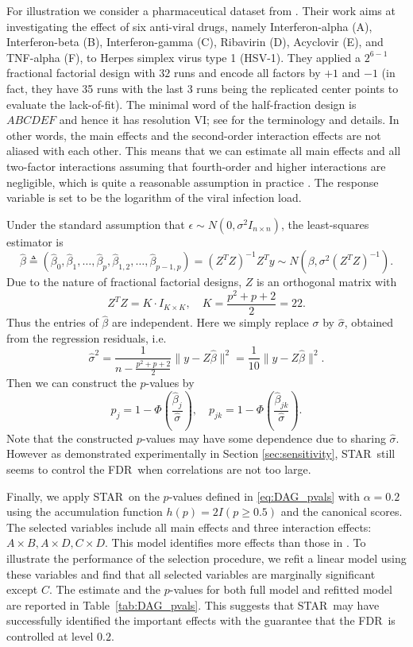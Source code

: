 \documentclass{biometrika}
\newcommand{\textFDR}{FDR}
\renewcommand{\star}{STAR}
\newcommand{\eps}{\epsilon}
\newcommand{\lb}{\left(}
\newcommand{\rb}{\right)}
\newcommand{\1}{\mathbf{1}}
\begin{document}
For illustration we consider a pharmaceutical dataset from \cite{jaynes13}. Their work aims at investigating the effect of six anti-viral drugs, namely Interferon-alpha (A), Interferon-beta (B), Interferon-gamma (C), Ribavirin (D), Acyclovir (E), and TNF-alpha (F), to Herpes simplex virus type 1 (HSV-1). They applied a $2^{6-1}$ fractional factorial design with $32$ runs and encode all factors by $+1$ and $-1$ (in fact, they have 35 runs with the last 3 runs being the replicated center points to evaluate the lack-of-fit).  The minimal word of the half-fraction design is $ABCDEF$ and hence it has resolution VI; see \cite{wu00} for the terminology and details. In other words, the main effects and the second-order interaction effects are not aliased with each other. This means that we can estimate all main effects and all two-factor interactions assuming that fourth-order and higher interactions are negligible, which is quite a reasonable assumption in practice \citep{jaynes13}. The response variable is set to be the logarithm of the viral infection load. 

Under the standard assumption that $\eps\sim N(0, \sigma^{2}I_{n\times n})$, the least-squares estimator is
\[\hat{\beta}\triangleq (\hat{\beta}_{0}, \hat{\beta}_{1}, \ldots, \hat{\beta}_{p}, \hat{\beta}_{1,2}, \ldots, \hat{\beta}_{p-1,p}) = (Z^{T}Z)^{-1}Z^{T}y\sim N(\beta, \sigma^{2}(Z^{T}Z)^{-1}).\]
Due to the nature of fractional factorial designs, $Z$ is an orthogonal matrix with 
\[Z^{T}Z = K\cdot I_{K\times K}, \quad K = \frac{p^2 + p + 2}{2} = 22.\]
Thus the entries of $\hat{\beta}$ are independent. Here we simply replace $\sigma$ by $\hat{\sigma}$, obtained from the regression residuals, i.e.
\[\hat{\sigma}^{2} = \frac{1}{n - \frac{p^{2} + p + 2}{2}}\|y- Z\hat{\beta}\|^{2} = \frac{1}{10}\|y- Z\hat{\beta}\|^{2}.\]
Then we can construct the $p$-values by
\begin{equation}\label{eq:DAG_pvals}
p_{j} = 1 - \Phi\lb\frac{\hat{\beta}_{j}}{\hat{\sigma}}\rb, \quad p_{jk} = 1 - \Phi\lb\frac{\hat{\beta}_{jk}}{\hat{\sigma}}\rb.
\end{equation}
Note that the constructed $p$-values may have some dependence due to sharing $\hat\sigma$. However as demonstrated experimentally in Section \ref{sec:sensitivity}, \star ~still seems to control the \textFDR ~when correlations are not too large. 

Finally, we apply \star ~on the $p$-values defined in \eqref{eq:DAG_pvals} with $\alpha = 0.2$ using the accumulation function $h(p) = 2I(p\ge 0.5)$ and the canonical scores. The selected variables include all main effects and three interaction effects: $A\times B, A\times D, C\times D$. This model identifies more effects than those in \cite{jaynes13}. To illustrate the performance of the selection procedure, we refit a linear model using these variables and find that all selected variables are marginally significant except $C$. The estimate and the $p$-values for both full model and refitted model are reported in Table~\ref{tab:DAG_pvals}. This suggests that \star ~may have successfully identified the important effects with the guarantee that the \textFDR ~is controlled at level $0.2$. 
\end{document}
